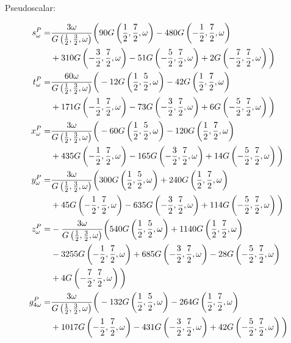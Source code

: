 \documentclass[aps,prc,superscriptaddress,showpacs,floatfix, nofootinbib,preprintnumbers,twocolumn]{revtex4}
\begin{document}
Pseudoscalar:
\begin{scriptsize}
\begin{align}
s^P_{\omega }=&\frac{3 \omega}{G\left(\frac{1}{2},\frac{3}{2},\omega \right)}\bigg{(}90 G\left(\frac{1}{2},\frac{7}{2},\omega \right)-480 G\left(-\frac{1}{2},\frac{7}{2},\omega \right)\nonumber\\
&+310 G\left(-\frac{3}{2},\frac{7}{2},\omega \right)-51 G\left(-\frac{5}{2},\frac{7}{2},\omega \right)+2 G\left(-\frac{7}{2},\frac{7}{2},\omega \right)\bigg{)}\\
t^P_{\omega }=&\frac{60 \omega  }{G\left(\frac{1}{2},\frac{3}{2},\omega \right)}\bigg{(}-12 G\left(\frac{1}{2},\frac{5}{2},\omega \right)-42 G\left(\frac{1}{2},\frac{7}{2},\omega \right)\nonumber\\
&+171 G\left(-\frac{1}{2},\frac{7}{2},\omega \right)-73 G\left(-\frac{3}{2},\frac{7}{2},\omega \right)+6 G\left(-\frac{5}{2},\frac{7}{2},\omega \right)\bigg{)}\\
x^P_{\omega }=&\frac{3 \omega  }{G\left(\frac{1}{2},\frac{3}{2},\omega \right)}\bigg{(}-60 G\left(\frac{1}{2},\frac{5}{2},\omega \right)-120 G\left(\frac{1}{2},\frac{7}{2},\omega \right)\nonumber\\
&+435 G\left(-\frac{1}{2},\frac{7}{2},\omega \right)-165 G\left(-\frac{3}{2},\frac{7}{2},\omega \right)+14 G\left(-\frac{5}{2},\frac{7}{2},\omega \right)\bigg{)}\\
y^P_{\omega }=&\frac{3 \omega  }{G\left(\frac{1}{2},\frac{3}{2},\omega \right)}\bigg{(}300 G\left(\frac{1}{2},\frac{5}{2},\omega \right)+240 G\left(\frac{1}{2},\frac{7}{2},\omega \right)\nonumber\\
&+45 G\left(-\frac{1}{2},\frac{7}{2},\omega \right)-635 G\left(-\frac{3}{2},\frac{7}{2},\omega \right)+114 G\left(-\frac{5}{2},\frac{7}{2},\omega \right)\bigg{)}\\
z^P_{\omega }=&-\frac{3 \omega  }{G\left(\frac{1}{2},\frac{3}{2},\omega \right)}\bigg{(}540 G\left(\frac{1}{2},\frac{5}{2},\omega \right)+1140 G\left(\frac{1}{2},\frac{7}{2},\omega \right)\nonumber\\
&-3255 G\left(-\frac{1}{2},\frac{7}{2},\omega \right)+685 G\left(-\frac{3}{2},\frac{7}{2},\omega \right)-28 G\left(-\frac{5}{2},\frac{7}{2},\omega \right)\nonumber\\&+4 G\left(-\frac{7}{2},\frac{7}{2},\omega \right)\bigg{)}\\
g^P_{4\omega }=&\frac{3 \omega  }{G\left(\frac{1}{2},\frac{3}{2},\omega \right)}\bigg{(}-132 G\left(\frac{1}{2},\frac{5}{2},\omega \right)-264 G\left(\frac{1}{2},\frac{7}{2},\omega \right)\nonumber\\
&+1017 G\left(-\frac{1}{2},\frac{7}{2},\omega \right)-431 G\left(-\frac{3}{2},\frac{7}{2},\omega \right)+42 G\left(-\frac{5}{2},\frac{7}{2},\omega \right)\bigg{)}
\end{align}
\end{scriptsize}
\end{document}
